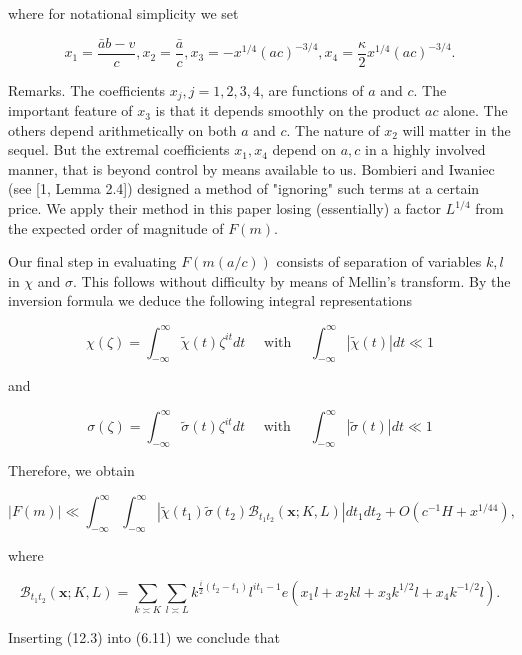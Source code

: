 \documentclass[10pt]{article}
\begin{document}
where for notational simplicity we set


\begin{equation*}
x_{1}=\frac{\bar{a} b-v}{c}, x_{2}=\frac{\bar{a}}{c}, x_{3}=-x^{1 / 4}(a c)^{-3 / 4}, x_{4}=\frac{\kappa}{2} x^{1 / 4}(a c)^{-3 / 4} . \tag{12.2}
\end{equation*}


Remarks. The coefficients $x_{j}, j=1,2,3,4$, are functions of $a$ and $c$. The important feature of $x_{3}$ is that it depends smoothly on the product $a c$ alone. The others depend arithmetically on both $a$ and $c$. The nature of $x_{2}$ will matter in the sequel. But the extremal coefficients $x_{1}, x_{4}$ depend on $a, c$ in a highly involved manner, that is beyond control by means available to us. Bombieri and Iwaniec (see [1, Lemma 2.4]) designed a method of "ignoring" such terms at a certain price. We apply their method in this paper losing (essentially) a factor $L^{1 / 4}$ from the expected order of magnitude of $F(m)$.

Our final step in evaluating $F(m(a / c))$ consists of separation of variables $k, l$ in $\chi$ and $\sigma$. This follows without difficulty by means of Mellin's transform. By the inversion formula we deduce the following integral representations

$$
\chi(\zeta)=\int_{-\infty}^{\infty} \tilde{\chi}(t) \zeta^{i t} d t \quad \text { with } \quad \int_{-\infty}^{\infty}|\tilde{\chi}(t)| d t \ll 1
$$

and

$$
\sigma(\zeta)=\int_{-\infty}^{\infty} \tilde{\sigma}(t) \zeta^{i t} d t \quad \text { with } \quad \int_{-\infty}^{\infty}|\tilde{\sigma}(t)| d t \ll 1
$$

Therefore, we obtain


\begin{equation*}
|F(m)| \ll \int_{-\infty}^{\infty} \int_{-\infty}^{\infty}\left|\tilde{\chi}\left(t_{1}\right) \tilde{\sigma}\left(t_{2}\right) \mathscr{B}_{t_{1} t_{2}}(\mathbf{x} ; K, L)\right| d t_{1} d t_{2}+O\left(c^{-1} H+x^{1 / 44}\right), \tag{12.3}
\end{equation*}


where

$$
\mathscr{B}_{t_{1} t_{2}}(\mathbf{x} ; K, L)=\sum_{k\asymp K}\sum_{l\asymp L} k^{\frac{i}{2}(t_{2}-t_{1})}l^{it_{1}-1} e\left(x_{1} l+x_{2} k l+x_{3} k^{1 / 2} l+x_{4} k^{-1 / 2} l\right) .
$$

Inserting (12.3) into (6.11) we conclude that
\end{document}
